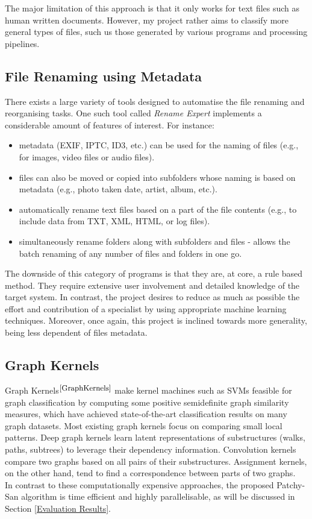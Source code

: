 The major limitation of this approach is that it only works for text files such as human written documents. However, my project rather aims to classify more general types of files, such us those generated by various programs and processing pipelines. \\

\subsection{File Renaming using Metadata}

There exists a large variety of tools designed to automatise the file renaming and reorganising tasks. One such tool called \textit{Rename Expert} implements a considerable amount of features of interest. For instance:

\begin{itemize}
  \item metadata (EXIF, IPTC, ID3, etc.) can be used for the naming of files (e.g., for images, video files or audio files).
  \item files can also be moved or copied into subfolders whose naming is based on metadata (e.g., photo taken date, artist, album, etc.).
  \item automatically rename text files based on a part of the file contents (e.g., to include data from TXT, XML, HTML, or log files).
  \item simultaneously rename folders along with subfolders and files - allows the batch renaming of any number of files and folders in one go.
\end{itemize}

The downside of this category of programs is that they are, at core, a rule based method. They require extensive user involvement and detailed knowledge of the target system. In contrast, the project desires to reduce as much as possible the effort and contribution of a specialist by using appropriate machine learning techniques. Moreover, once again, this project is inclined towards more generality, being less dependent of files metadata. \\


\subsection{Graph Kernels}

Graph Kernels$^{\small \cite{GraphKernels}}$ make kernel machines such as SVMs feasible for graph classification by computing some positive semidefinite graph similarity measures, which have achieved state-of-the-art classification results on many graph datasets. Most existing graph kernels focus on comparing small local patterns. Deep graph kernels learn latent representations of substructures (walks, paths, subtrees) to leverage their dependency information. Convolution kernels compare two graphs based on all pairs of their substructures. Assignment kernels, on the other hand, tend to find a correspondence between parts of two graphs. \\

In contrast to these computationally expensive approaches, the proposed Patchy-San algorithm is time efficient and highly parallelisable, as will be discussed in Section \ref{Evaluation Results}.

